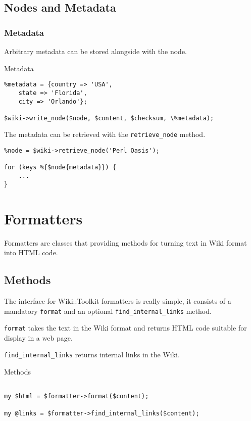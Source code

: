 \subsection{Nodes and Metadata}

\subsubsection{Metadata}


Arbitrary metadata can be stored alongside with the node.

\begin{frame}[fragile]{Metadata}

\begin{lstlisting}
%metadata = {country => 'USA', 
    state => 'Florida',
    city => 'Orlando'};

$wiki->write_node($node, $content, $checksum, \%metadata);
\end{lstlisting}
\end{frame}

The metadata can be retrieved with the \verb+retrieve_node+ method.

\begin{lstlisting}
%node = $wiki->retrieve_node('Perl Oasis');

for (keys %{$node{metadata}}) {
    ...
}
\end{lstlisting}

\section{Formatters}

Formatters are classes that providing methods for turning text in
Wiki format into HTML code.

\subsection{Methods}

The interface for Wiki::Toolkit formatters is really simple, it consists
of a mandatory \verb+format+ and an optional \verb+find_internal_links+
method.

\verb+format+ takes the text in the Wiki format and returns HTML code
suitable for display in a web page.

\verb+find_internal_links+ returns internal links in the Wiki.

\begin{frame}[fragile]{Methods}
\begin{lstlisting}

my $html = $formatter->format($content);

my @links = $formatter->find_internal_links($content);

\end{lstlisting}
\end{frame}

